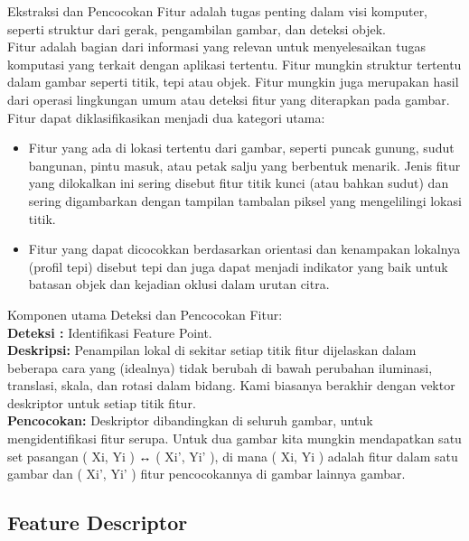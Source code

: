 \documentclass[
  letterpaper,
  DIV=11,
  numbers=noendperiod]{scrreprt}
\providecommand{\tightlist}{%
  \setlength{\itemsep}{0pt}\setlength{\parskip}{0pt}}\usepackage{longtable,booktabs,array}
\begin{document}

Ekstraksi dan Pencocokan Fitur adalah tugas penting dalam visi komputer,
seperti struktur dari gerak, pengambilan gambar, dan deteksi objek.\\
Fitur adalah bagian dari informasi yang relevan untuk menyelesaikan
tugas komputasi yang terkait dengan aplikasi tertentu. Fitur mungkin
struktur tertentu dalam gambar seperti titik, tepi atau objek. Fitur
mungkin juga merupakan hasil dari operasi lingkungan umum atau deteksi
fitur yang diterapkan pada gambar. Fitur dapat diklasifikasikan menjadi
dua kategori utama:

\begin{itemize}
\tightlist
\item
  Fitur yang ada di lokasi tertentu dari gambar, seperti puncak gunung,
  sudut bangunan, pintu masuk, atau petak salju yang berbentuk menarik.
  Jenis fitur yang dilokalkan ini sering disebut fitur titik kunci (atau
  bahkan sudut) dan sering digambarkan dengan tampilan tambalan piksel
  yang mengelilingi lokasi titik.\\
\item
  Fitur yang dapat dicocokkan berdasarkan orientasi dan kenampakan
  lokalnya (profil tepi) disebut tepi dan juga dapat menjadi indikator
  yang baik untuk batasan objek dan kejadian oklusi dalam urutan citra.
\end{itemize}

Komponen utama Deteksi dan Pencocokan Fitur:\\
\textbf{Deteksi :} Identifikasi Feature Point.\\
\textbf{Deskripsi:} Penampilan lokal di sekitar setiap titik fitur
dijelaskan dalam beberapa cara yang (idealnya) tidak berubah di bawah
perubahan iluminasi, translasi, skala, dan rotasi dalam bidang. Kami
biasanya berakhir dengan vektor deskriptor untuk setiap titik fitur.\\
\textbf{Pencocokan:} Deskriptor dibandingkan di seluruh gambar, untuk
mengidentifikasi fitur serupa. Untuk dua gambar kita mungkin mendapatkan
satu set pasangan ( Xi, Yi ) ↔ ( Xi', Yi' ), di mana ( Xi, Yi ) adalah
fitur dalam satu gambar dan ( Xi', Yi' ) fitur pencocokannya di gambar
lainnya gambar.

\hypertarget{feature-descriptor}{%
\subsection*{Feature Descriptor}\label{feature-descriptor}}
\end{document}
